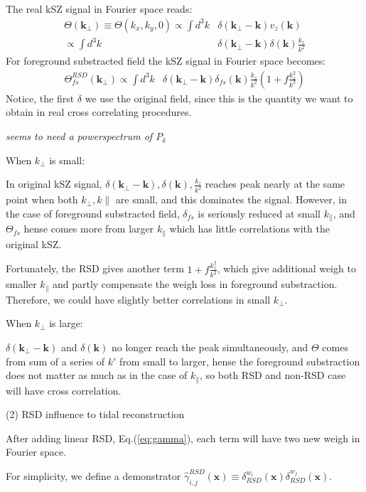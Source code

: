 The real kSZ signal in Fourier space reads:
\begin{eqnarray}
    \Theta(\bm{k_\perp})\equiv \Theta(k_x,k_y,0)\propto\int d^3k&\delta(\bm{k_\perp}-\bm{k}) v_z(\bm{k})\\
    \propto\int d^3k&\delta(\bm{k_\perp}-\bm{k})\delta(\bm{k})\frac{k_z}{k^2}\nonumber
\end{eqnarray}
For foreground substracted field the kSZ signal in Fourier space becomes:
\begin{eqnarray}
    \Theta_{fs}^{RSD}(\bm{k_\perp})
    \propto\int d^3k&\delta(\bm{k_\perp}-\bm{k})\delta_{fs}(\bm{k})\frac{k_z}{k^2}(1+f\frac{k_z^2}{k^2})
\end{eqnarray}
Notice, the first $\delta$ we use the original field, since this is the quantity we want to obtain in real cross correlating procedures.

{\it seems to need a powerspectrum of $P_\delta$}

When $k_\perp$ is small: 

In original kSZ signal, $\delta(\bm{k_\perp}-\bm{k}),\delta(\bm{k}),\frac{k_z}{k^2}$ reaches peak nearly at the same point when both $k_\perp,k\parallel$ are small, and this dominates the signal. 
However, in the case of foreground substracted field, 
$\delta_{fs}$ is seriously reduced at small $k_\parallel$, 
and $\Theta_{fs}$ hense comes more from larger $k_\parallel$ 
which has little correlations with the original kSZ.

Fortunately, the RSD gives another term $1+f\frac{k_z^2}{k^2}$, 
which give additional weigh to smaller $k_\parallel$ 
and partly compensate the weigh loss in foreground substraction. 
Therefore, we could have slightly better correlations in small $k_\perp$.

When $k_\perp$ is large:

$\delta(\bm{k_\perp}-\bm{k})$ and $\delta(\bm{k})$ 
no longer reach the peak simultaneously, 
and $\Theta$ comes from sum of a series of $k\prime$ from small to larger, 
hense the foreground substraction does not matter as much as in the case of $k_\parallel$, 
so both RSD and non-RSD case will have cross correlation.

(2) RSD influence to tidal reconstruction

After adding linear RSD, Eq.(\ref{eq:gamma}), each term will have two new weigh in Fourier space.

For simplicity, 
we define a demonstrator $\hat\gamma_{i,j}^{RSD}(\bm{x})\equiv\delta_{RSD}^{w_i}(\bm{x})\delta_{RSD}^{w_j}(\bm{x})$. 


